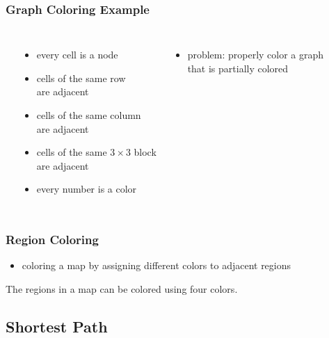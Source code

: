 \documentclass[dvipsnames]{beamer}
\begin{document}
\begin{frame}
  \frametitle{Graph Coloring Example}

  \begin{example}[Sudoku]
    \begin{columns}[t]
      \begin{center}
      \end{center}

      \begin{itemize}
        \item every cell is a node
        \item cells of the same row\\
          are adjacent
        \item cells of the same column\\
          are adjacent
        \item cells of the same $3 \times 3$ block\\
          are adjacent
        \item every number is a color
      \end{itemize}

      \pause
      \begin{itemize}
        \item problem: properly color a graph\\
          that is partially colored
      \end{itemize}
    \end{columns}
  \end{example}
\end{frame}

\begin{frame}
  \frametitle{Region Coloring}

  \begin{itemize}
    \item coloring a map by assigning different colors to adjacent regions
  \end{itemize}

  \medskip
  \begin{theorem}
    The regions in a map can be colored using four colors.
  \end{theorem}
\end{frame}

\subsection{Shortest Path}
\end{document}
